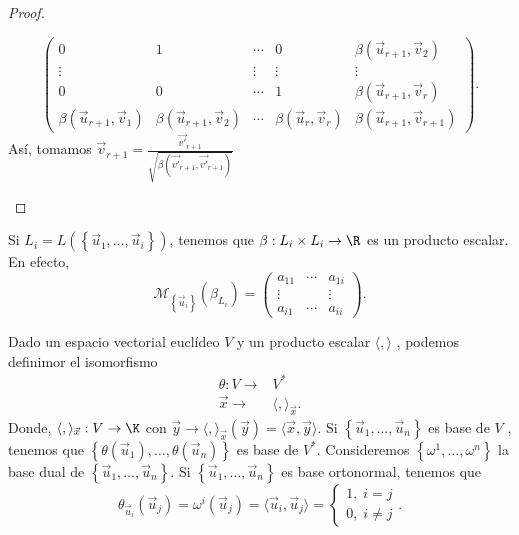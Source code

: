 \begin{proof}
\begin{description}
\[\begin{pmatrix}
0 & 1 & \cdots & 0 & \beta\left(\vec{u}_{r+1}, \vec{v}_{2}\right) \\
\vdots & & \vdots & \vdots & \vdots \\
0 & 0 & \cdots & 1 & \beta\left(\vec{u}_{r+1}, \vec{v}_{r}\right) \\
\beta\left(\vec{u}_{r+1}, \vec{v}_{1}\right) & \beta\left(\vec{u}_{r+1}, \vec{v}_{2}\right) & \cdots & \beta\left(\vec{u}_{r}, \vec{v}_{r}\right) & \beta\left(\vec{u}_{r+1}, \vec{v}_{r+1}\right)\end{pmatrix} .\]
Así, tomamos $\displaystyle \vec{v}_{r+1} = \frac{\vec{v'}_{r+1}}{\sqrt{\beta\left(\vec{v'}_{r+1}, \vec{v'}_{r+1}\right)}} $ 
\end{description}
\end{proof}
\begin{observation}
\normalfont Si $\displaystyle L_{i} = L\left( \left\{ \vec{u}_{1}, \ldots, \vec{u}_{i}\right\} \right) $, tenemos que $\displaystyle \beta:L_{i} \times L_{i} \to \R $ es un producto escalar. En efecto,
\[\mathcal{M}_{ \left\{ \vec{u}_{i}\right\} }\left(\beta_{L_{i}}\right) = \begin{pmatrix} a_{11} & \cdots & a_{1i} \\
\vdots & & \vdots \\
a_{i1} & \cdots & a_{ii}\end{pmatrix} .\]
\end{observation}
Dado un espacio vectorial euclídeo $\displaystyle V $ y un producto escalar $\displaystyle \langle, \rangle  $ , podemos definimor el isomorfismo
\[
\begin{split}
	\theta : V \to & V^{*} \\
	\vec{x} \to & \langle, \rangle _{\vec{x}}.
\end{split}
\]
Donde, $\displaystyle \langle, \rangle _{\vec{x}} : V \to \K  $ con $\displaystyle \vec{y} \to \langle, \rangle_{\vec{x}}\left(\vec{y}\right) = \langle \vec{x}, \vec{y}\rangle  $. Si $\displaystyle \left\{ \vec{u}_{1}, \ldots, \vec{u}_{n}\right\}  $ es base de $\displaystyle V $ , tenemos que $\displaystyle \left\{ \theta\left(\vec{u}_{1}\right), \ldots, \theta\left(\vec{u}_{n}\right)\right\}  $ es base de $\displaystyle V^{*} $.
Consideremos $\displaystyle \left\{ \omega^{1}, \ldots, \omega^{n}\right\}  $ la base dual de $\displaystyle \left\{ \vec{u}_{1}, \ldots, \vec{u}_{n}\right\}  $. Si $\displaystyle \left\{ \vec{u}_{1}, \ldots, \vec{u}_{n}\right\}  $ es base ortonormal, tenemos que 
\[\theta_{\vec{u}_{i}}\left(\vec{u}_{j}\right) = \omega^{i}\left(\vec{u}_{j}\right) = \langle \vec{u}_{i}, \vec{u}_{j}\rangle =
\begin{cases}
1, \; i = j \\
0, \; i \neq j
\end{cases}
.\]
